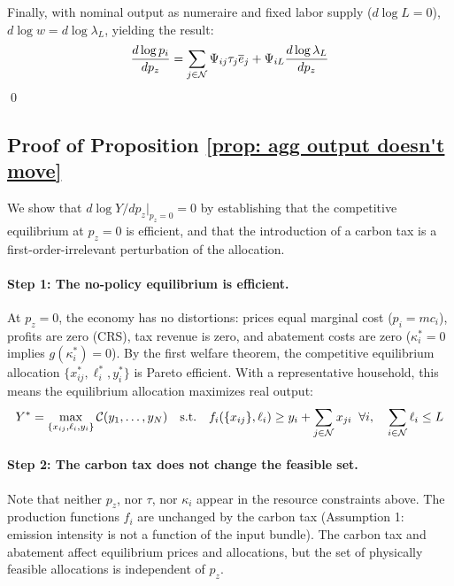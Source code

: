 Finally, with nominal output as numeraire and fixed labor supply ($d \log L = 0$), $d \log w = d \log \lambda_L$, yielding the result:
\begin{equation*}
    \frac{d \log p_i}{dp_z} = \sum_{j \in \mathcal{N}} \Psi_{ij} \tau_j \overline{e}_j + \Psi_{iL} \frac{d \log \lambda_L}{dp_z}
\end{equation*}
\qed

\subsection{Proof of Proposition \ref{prop: agg output doesn't move}}

We show that $d \log Y / dp_z|_{p_z = 0} = 0$ by establishing that the competitive equilibrium at $p_z = 0$ is efficient, and that the introduction of a carbon tax is a first-order-irrelevant perturbation of the allocation.

\paragraph{Step 1: The no-policy equilibrium is efficient.} At $p_z = 0$, the economy has no distortions: prices equal marginal cost ($p_i = mc_i$), profits are zero (CRS), tax revenue is zero, and abatement costs are zero ($\kappa_i^* = 0$ implies $g(\kappa_i^*) = 0$). By the first welfare theorem, the competitive equilibrium allocation $\{x_{ij}^*, \ell_i^*, y_i^*\}$ is Pareto efficient. With a representative household, this means the equilibrium allocation maximizes real output:
\begin{equation*}
    Y^* = \max_{\{x_{ij}, \ell_i, y_i\}} \mathcal{C}(y_1, \ldots, y_N) \quad \text{s.t.} \quad f_i(\{x_{ij}\}, \ell_i) \geq y_i + \sum_{j \in \mathcal{N}} x_{ji} \;\; \forall i, \quad \sum_{i \in \mathcal{N}} \ell_i \leq L
\end{equation*}

\paragraph{Step 2: The carbon tax does not change the feasible set.} Note that neither $p_z$, nor $\tau$, nor $\kappa_i$ appear in the resource constraints above. The production functions $f_i$ are unchanged by the carbon tax (Assumption 1: emission intensity is not a function of the input bundle). The carbon tax and abatement affect equilibrium prices and allocations, but the set of physically feasible allocations is independent of $p_z$.


